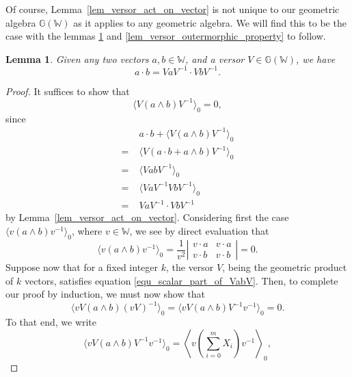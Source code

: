 \documentclass{birkjour}
\newtheorem{lem}[thm]{Lemma}
\theoremstyle{definition}
\theoremstyle{remark}
\numberwithin{equation}{section}
\newcommand{\G}{\mathbb{G}}
\newcommand{\W}{\mathbb{W}}
\begin{document}
Of course, Lemma~\ref{lem_versor_act_on_vector} is not unique to our geometric algebra $\G(\W)$ as it
applies to any geometric algebra.  We will find this to be the case with the lemmas \ref{lem_versor_property_with_ip}
and \ref{lem_versor_outermorphic_property} to follow.

\begin{lem}\label{lem_versor_property_with_ip}
Given any two vectors $a,b\in\W$, and a versor $V\in\G(\W)$, we have
\begin{equation}
a\cdot b = VaV^{-1}\cdot VbV^{-1}.
\end{equation}
\end{lem}
\begin{proof}
It suffices to show that
\begin{equation}\label{equ_scalar_part_of_VabV}
\langle V(a\wedge b)V^{-1}\rangle_0=0,
\end{equation}
since
\begin{align}
 & a\cdot b + \langle V(a\wedge b)V^{-1}\rangle_0 \\
=\;& \langle V(a\cdot b + a\wedge b)V^{-1}\rangle_0 \\
=\;& \langle VabV^{-1}\rangle_0 \\
=\;& \langle VaV^{-1}VbV^{-1}\rangle_0 \\
=\;& VaV^{-1}\cdot VbV^{-1}
\end{align}
by Lemma~\ref{lem_versor_act_on_vector}.  Considering first the
case $\langle v(a\wedge b)v^{-1}\rangle_0$, where $v\in\W$, we see
by direct evaluation that
\begin{equation}\label{equ_det_vabv_zero}
\langle v(a\wedge b)v^{-1}\rangle_0=\frac{1}{v^2}\left|
\begin{array}{cc}
v\cdot a & v\cdot a \\
v\cdot b & v\cdot b
\end{array}\right|=0.
\end{equation}
Suppose now that for a fixed integer $k$, the versor $V$, being the geometric
product of $k$ vectors, satisfies equation \eqref{equ_scalar_part_of_VabV}.
Then, to complete our proof by induction, we must now show that
\begin{equation}
\langle vV(a\wedge b)(vV)^{-1}\rangle_0=\langle vV(a\wedge b)V^{-1}v^{-1}\rangle_0=0.
\end{equation}
To that end, we write
\begin{equation}\label{equ_sum_vev_zero}
\langle vV(a\wedge b)V^{-1}v^{-1}\rangle_0 = \left\langle v\left(\sum_{i=0}^m X_i\right)v^{-1}\right\rangle_0,
\end{equation}

\end{proof}
\end{document}
